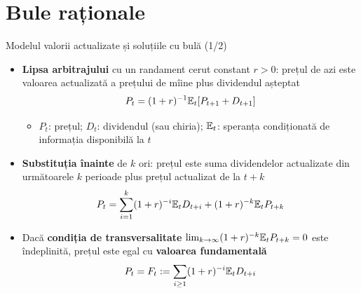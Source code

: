 \section{Bule raționale}

\begin{frame}{Modelul valorii actualizate și soluțiile cu bulă (1/2)}
\itemsize{\small}
\begin{itemize}
    \item \textbf{Lipsa arbitrajului} cu un randament cerut constant $r > 0$: prețul de azi este valoarea actualizată a prețului de mîine plus dividendul așteptat \[ P_t = (1 + r)^{-1}\mathbb{E}_t[P_{t+1} + D_{t+1}] \]
    \begin{itemize}
        \item $P_t$: prețul; $D_t$: dividendul (sau chiria); $\mathbb{E}_t$: speranța condiționată de informația disponibilă la $t$
    \end{itemize}
    \item \textbf{Substituția înainte} de $k$ ori: prețul este suma dividendelor actualizate din următoarele $k$ perioade plus prețul actualizat de la $t + k$ \[ P_t = \sum_{i=1}^{k}(1 + r)^{-i}\mathbb{E}_t D_{t+i} + (1 + r)^{-k}\mathbb{E}_t P_{t+k} \]
    \item Dacă \textbf{condiția de transversalitate} $\lim_{k\to\infty} (1 + r)^{-k}\mathbb{E}_t P_{t+k} = 0$ este îndeplinită, prețul este egal cu \textbf{valoarea fundamentală} \[ P_t = F_t := \sum_{i \ge 1}(1 + r)^{-i}\mathbb{E}_t D_{t+i} \]
\end{itemize}
\end{frame}

